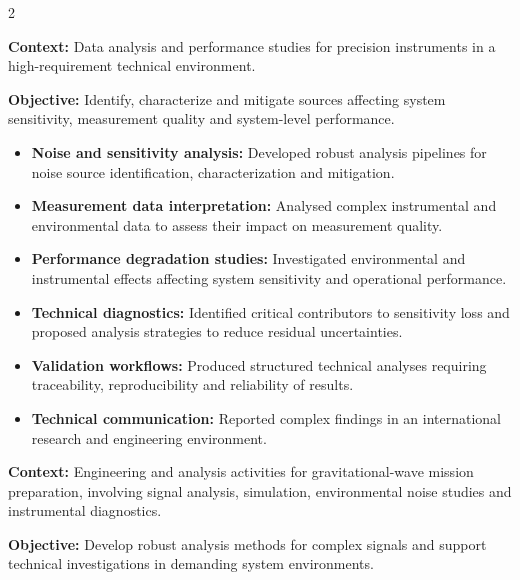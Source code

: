 \documentclass[8pt,a4paper,ragged2e,withhyper]{../_shared/altacv}
\begin{document}
\begin{paracol}{2}
\divider


\textbf{Context:} Data analysis and performance studies for precision instruments in a high-requirement technical environment.

\textbf{Objective:} Identify, characterize and mitigate sources affecting system sensitivity, measurement quality and system-level performance.

\begin{itemize}
\item \textbf{Noise and sensitivity analysis:} Developed robust analysis pipelines for noise source identification, characterization and mitigation.
\item \textbf{Measurement data interpretation:} Analysed complex instrumental and environmental data to assess their impact on measurement quality.
\item \textbf{Performance degradation studies:} Investigated environmental and instrumental effects affecting system sensitivity and operational performance.
\item \textbf{Technical diagnostics:} Identified critical contributors to sensitivity loss and proposed analysis strategies to reduce residual uncertainties.
\item \textbf{Validation workflows:} Produced structured technical analyses requiring traceability, reproducibility and reliability of results.
\item \textbf{Technical communication:} Reported complex findings in an international research and engineering environment.
\end{itemize}

\divider


\textbf{Context:} Engineering and analysis activities for gravitational-wave mission preparation, involving signal analysis, simulation, environmental noise studies and instrumental diagnostics.

\textbf{Objective:} Develop robust analysis methods for complex signals and support technical investigations in demanding system environments.


\end{paracol}
\end{document}
